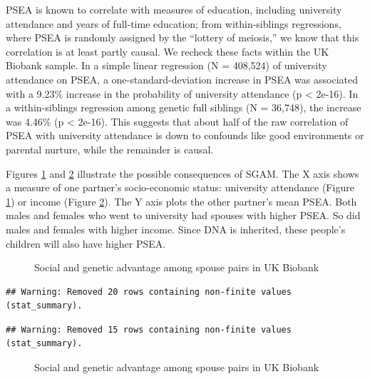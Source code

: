 \documentclass[
]{article}
\begin{document}
PSEA is known to correlate with measures of education, including
university attendance and years of full-time education; from
within-siblings regressions, where PSEA is randomly assigned by the
``lottery of meiosis,'' we know that this correlation is at least partly
causal. We recheck these facts within the UK Biobank sample. In a simple
linear regression (N = 408,524) of university attendance
on PSEA, a one-standard-deviation increase in PSEA was associated with a
9.23\% increase in the probability of
university attendance (p \textless{} 2e-16). In a within-siblings regression
among genetic full siblings (N = 36,748), the
increase was 4.46\% (p \textless{} 2e-16). This
suggests that about half of the raw correlation of PSEA with university
attendance is down to confounds like good environments or parental
nurture, while the remainder is causal.

Figures \ref{fig:pic-basic-corr-uni} and
\ref{fig:pic-basic-corr-income} illustrate the possible consequences of
SGAM. The X axis shows a measure of one partner's socio-economic status:
university attendance (Figure \ref{fig:pic-basic-corr-uni}) or income
(Figure \ref{fig:pic-basic-corr-income}). The Y axis plots the other
partner's mean PSEA. Both males and females who went to university had
spouses with higher PSEA. So did males and females with higher income.
Since DNA is inherited, these people's children will also have higher
PSEA.

\begin{figure}
\caption{Social and genetic advantage among spouse pairs in UK Biobank}\label{fig:pic-basic-corr-uni}
\end{figure}

\begin{verbatim}
## Warning: Removed 20 rows containing non-finite values (stat_summary).
\end{verbatim}

\begin{verbatim}
## Warning: Removed 15 rows containing non-finite values (stat_summary).
\end{verbatim}

\begin{figure}
\caption{Social and genetic advantage among spouse pairs in UK Biobank}\label{fig:pic-basic-corr-income}
\end{figure}
\end{document}

